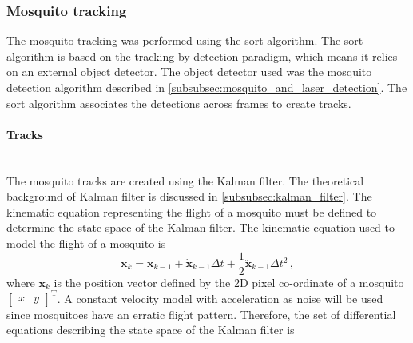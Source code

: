 \subsubsection{Mosquito tracking}
The mosquito tracking was performed using the \gls{sort} algorithm. The \gls{sort} algorithm is based on the tracking-by-detection paradigm, which means it relies on an external object detector. The object detector used was the mosquito detection algorithm described in \autoref{subsubsec:mosquito_and_laser_detection}. The \gls{sort} algorithm associates the detections across frames to create tracks.


\paragraph{Tracks}\mbox{}\\
The mosquito tracks are created using the Kalman filter. The theoretical background of Kalman filter is discussed in \autoref{subsubsec:kalman_filter}. The kinematic equation representing the flight of a mosquito must be defined to determine the state space of the Kalman filter. The kinematic equation used to model the flight of a mosquito is
\begin{equation}
    \label{eq:mosquito_kinematic_equation}
    \mathbf{x}_{k} = \mathbf{x}_{k-1} + \mathbf{\dot{x}}_{k-1}\Delta t + \frac{1}{2}\mathbf{\ddot{{x}}}_{k-1}\Delta t^2\,,
\end{equation}
where $\mathbf{x}_{k}$ is the position vector defined by the 2D pixel co-ordinate of a mosquito $\begin{bmatrix} x & y \end{bmatrix}^\mathrm{T}$. A constant velocity model with acceleration as noise will be used since mosquitoes have an erratic flight pattern. Therefore, the set of differential equations describing the state space of the Kalman filter is
